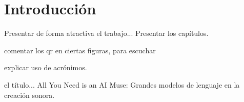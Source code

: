 \chapter{Introducción}



Presentar de forma atractiva el trabajo... 
Presentar los capítulos.

comentar los qr en ciertas figuras, para escuchar

explicar uso de acrónimos.




el título... All You Need is an AI Muse: Grandes modelos de lenguaje en la creación sonora.







